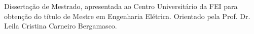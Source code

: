


\makeindex

\makeglossaries



\maketitle
\begin{folhaderosto}
Dissertação de Mestrado, apresentada ao Centro Universitário da FEI para obtenção do título de Mestre em Engenharia Elétrica. Orientado pela Prof. Dr. Leila Cristina Carneiro Bergamasco.
\end{folhaderosto}


\printglossaries
\tableofcontents









\printbibliography

% 

